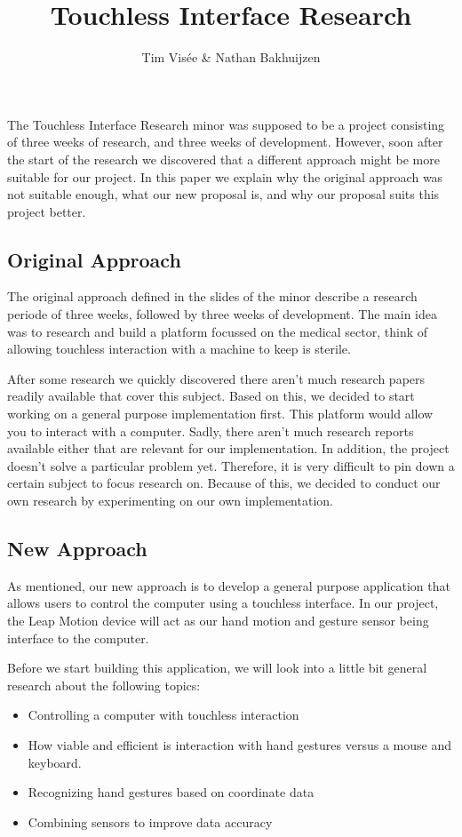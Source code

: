 \documentclass[a4paper]{article}
\title{Touchless Interface Research}
\author{Tim Visée \& Nathan Bakhuijzen}
\providecommand{\tightlist}{%
\setlength{\itemsep}{0pt}\setlength{\parskip}{0pt}}
\begin{document}

\maketitle

The Touchless Interface Research minor was supposed to be a project consisting
of three weeks of research, and three weeks of development. However, soon after
the start of the research we discovered that a different approach might be more
suitable for our project. In this paper we explain why the original approach was
not suitable enough, what our new proposal is, and why our proposal suits this
project better.

\subsection*{Original Approach}
The original approach defined in the slides of the minor describe a research
periode of three weeks, followed by three weeks of development.
The main idea was to research and build a platform focussed on the medical
sector, think of allowing touchless interaction with a machine to keep is
sterile.

After some research we quickly discovered there aren't much research
papers readily available that cover this subject. Based on this, we decided to
start working on a general purpose implementation first. This platform would
allow you to interact with a computer. Sadly, there aren't much research reports
available either that are relevant for our implementation. In addition, the
project doesn't solve a particular problem yet. Therefore, it is very difficult
to pin down a certain subject to focus research on. Because of this, we
decided to conduct our own research by experimenting on our own implementation.

\subsection*{New Approach}
As mentioned, our new approach is to develop a general purpose application that
allows users to control the computer using a touchless interface.
In our project, the Leap Motion device will act as our hand motion and gesture
sensor being interface to the computer.

Before we start building this application, we will look into a little bit
general research about the following topics:
\begin{itemize}
  \tightlist{}
  \item Controlling a computer with touchless interaction
  \item How viable and efficient is interaction with hand gestures versus a
      mouse and keyboard.
  \item Recognizing hand gestures based on coordinate data
  \item Combining sensors to improve data accuracy
\end{itemize}
\end{document}
